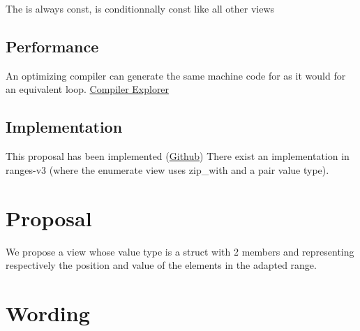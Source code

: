 \documentclass{wg21}
\begin{document}
The  is always const,  is conditionnally const like all other views

\subsection{Performance}

An optimizing compiler can generate the same machine code for  as it would for an equivalent  loop.  \href{https://godbolt.org/z/2Kxo8d}{Compiler Explorer}


\subsection{Implementation}

This proposal has been implemented (\href{https://github.com/cor3ntin/rangesnext/blob/master/include/cor3ntin/rangesnext/enumerate.hpp}{Github})
There exist an implementation in ranges-v3 (where the enumerate view uses zip_with and a pair value type).

\section{Proposal}

We propose a view  whose value type is a struct with 2 members  and 
representing respectively the position and value of the elements in the adapted range. 

\section{Wording}
\end{document}
